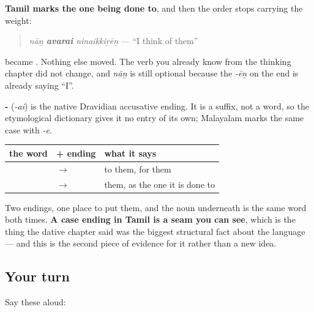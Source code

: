 \textbf{Tamil marks the one being done to}, and then the order stops carrying the weight:

\begin{quote}
 \textbf{} 
\end{quote}

\begin{quote}
\emph{nāṉ \textbf{avarai} ninaikkiṟēṉ} — \textquotedblleft{}I think of them\textquotedblright{}
\end{quote}

\textbf{} became \textbf{}. Nothing else moved. The verb you already know from the thinking chapter did not change, and \emph{nāṉ} is still optional because the \emph{-ēṉ} on the end is already saying \textquotedblleft{}I\textquotedblright{}.

\begin{cousinweb}
\textbf{-} (\emph{-ai}) is the native Dravidian accusative ending. It is a suffix, not a word, so the etymological dictionary gives it no entry of its own; Malayalam marks the same case with \emph{-e}.
\end{cousinweb}

\begin{grammarlens}[title={Grammar Lens: where the two endings sit}]
\noindent
\begin{tabularx}{\linewidth}{@{}>{\raggedright\arraybackslash}X>{\raggedright\arraybackslash}X>{\raggedright\arraybackslash}X@{}}
\toprule
\textbf{the word} & \textbf{+ ending} & \textbf{what it says} \\
\midrule
\ta{அவர்} & \ta{அவர்}\textbf{\ta{உக்கு}} $\to$ \textbf{\ta{அவருக்கு}} & to them, for them \\
\ta{அவர்} & \ta{அவர்}\textbf{\ta{ஐ}} $\to$ \textbf{\ta{அவரை}} & them, as the one it is done to \\
\bottomrule
\end{tabularx}

Two endings, one place to put them, and the noun underneath is the same word both times. \textbf{A case ending in Tamil is a seam you can see}, which is the thing the dative chapter said was the biggest structural fact about the language — and this is the second piece of evidence for it rather than a new idea.
\end{grammarlens}

\subsection*{Your turn}
Say these aloud:

